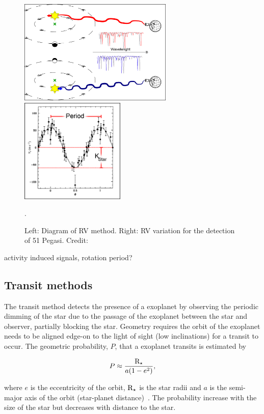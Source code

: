 \begin{figure}
    \centering
        \includegraphics[height=5cm]{./figures/introduction/RV_Diagram}
    \includegraphics[height=5cm]{./figures/introduction/PhaseFolded_51Pegb_Mayor_et_al_1995}
    \caption{Left: Diagram of {RV} method. Right: {RV} variation for the detection of {51 Pegasi}. Credit:~\citet{mayor_jupitermass_1995}}.
    \label{fig:rvdiagram-mayor}
\end{figure}


activity induced signals, rotation period?

\subsection{Transit methods}
\label{sub:transit}
The transit method detects the presence of a exoplanet by observing the periodic dimming of the star due to the passage of the exoplanet between the star and observer, partially blocking the star.
Geometry requires the orbit of the exoplanet needs to be aligned edge-on to the light of sight (low inclinations) for a transit to occur.
The geometric probability, $P$, that a exoplanet transits is estimated by 

\begin{equation}
P \approx \frac{\textrm{R}_{\star}}{a (1-{e}^{2})},
\end{equation}

where \(e\) is the eccentricity of the orbit, $\textrm{R}_{\star}$ is the star radii and \(a\) is the semi-major axis of the orbit (star-planet distance)~\citep{barnes_effects_2007}.
The probability increase with the size of the star but decreases with distance to the star.


